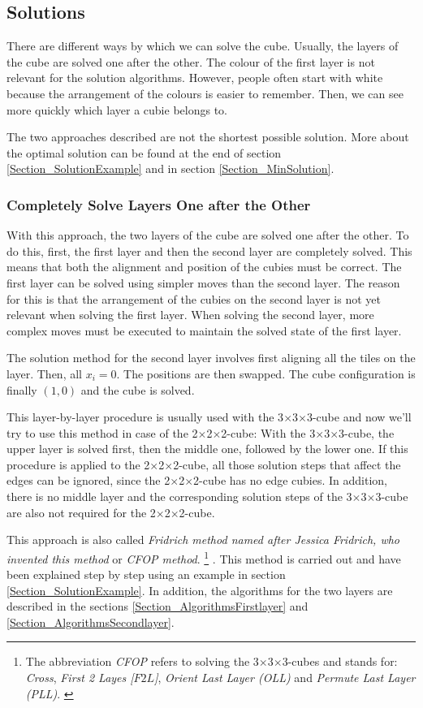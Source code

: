 \documentclass[12pt,a4paper]{article}
\theoremstyle{custom}
\newcommand{\Ttwo}{2$\times$2$\times$2-}
\newcommand{\Tthree}{3$\times$3$\times$3-}
\begin{document}
\subsection{Solutions}
\label{Section_Solutions}


There are different ways by which we can solve the cube. Usually, the layers of the cube are solved one after the other.
The colour of the first layer is not relevant for the solution algorithms. However, people often start with white because the arrangement of the colours is easier to remember. Then, we can see more quickly which layer a cubie belongs to.

The two approaches described are not the shortest possible solution. More about the optimal solution can be found at the end of section \ref{Section_SolutionExample} and in section \ref{Section_MinSolution}. 

\subsubsection{Completely Solve Layers One after the Other}

With this approach, the two layers of the cube are solved one after the other. To do this, first, the first layer and then the second layer are completely solved. This means that both the alignment and position of the cubies must be correct. The first layer can be solved using simpler moves than the second layer. The reason for this is that the arrangement of the cubies on the second layer is not yet relevant when solving the first layer. When solving the second layer, more complex moves must be executed to maintain the solved state of the first layer.

The solution method for the second layer involves first aligning all the tiles on the layer. Then, all $x_i=0$. The positions are then swapped. The cube configuration is finally $(1,0)$ and the cube is solved.

This layer-by-layer procedure is usually used with the \Tthree cube and now we'll try to use this method in case of the \Ttwo cube: With the \Tthree cube, the upper layer is solved first, then the middle one, followed by the lower one. If this procedure is applied to the \Ttwo cube, all those solution steps that affect the edges can be ignored, since the \Ttwo cube has no edge cubies. In addition, there is no middle layer and the corresponding solution steps of the \Tthree cube are also not required for the \Ttwo cube.

This approach is also called \textit{Fridrich method named after Jessica Fridrich, who invented this method}  or \textit{CFOP method}. 
\footnote{The abbreviation \textit{CFOP} refers to solving the \Tthree cubes and stands for: \textit{Cross}, \textit{First 2 Layes [$F2L$]}, \textit{Orient Last Layer (OLL)} and \textit{Permute Last Layer (PLL)}. \cite{DDJT}}  \cite{DDJT,fridrich1997}.
This method is carried out and have been explained step by step using an example in section \ref{Section_SolutionExample}. In addition, the algorithms for the two layers are described in the sections \ref{Section_AlgorithmsFirstlayer} and \ref{Section_AlgorithmsSecondlayer}. 
\end{document}

